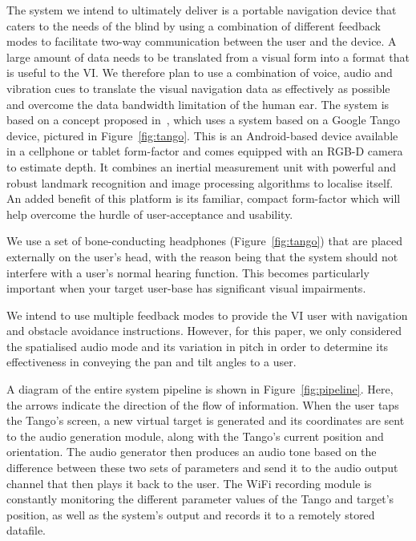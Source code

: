 \documentclass[format=sigconf, review=true, screen=true, anonymous=true]{acmart}
\begin{document}
The system we intend to ultimately deliver is a portable navigation device that caters to the needs of the blind by using a combination of different feedback modes to facilitate two-way communication between the user and the device. A large amount of data needs to be translated from a visual form into a format that is useful to the VI. We therefore plan to use a combination of voice, audio and vibration cues to translate the visual navigation data as effectively as possible and overcome the data bandwidth limitation of the human ear. The system is based on a concept proposed in~\cite{bellotto2013, lock2017portable}, which uses a system based on a Google Tango device, pictured in Figure~\ref{fig:tango}. This is an Android-based device available in a cellphone or tablet form-factor and comes equipped with an RGB-D camera to estimate depth. It combines an inertial measurement unit with powerful and robust landmark recognition and image processing algorithms to localise itself. An added benefit of this platform is its familiar, compact form-factor which will help overcome the hurdle of user-acceptance and usability. %

We use a set of bone-conducting headphones (Figure~\ref{fig:tango}) that are placed externally on the user's head, with the reason being that the system should not interfere with a user's normal hearing function. This becomes particularly important when your target user-base has significant visual impairments. 

We intend to use multiple feedback modes to provide the VI user with navigation and obstacle avoidance instructions. However, for this paper, we only considered the spatialised audio mode and its variation in pitch in order to determine its effectiveness in conveying the pan and tilt angles to a user.

A diagram of the entire system pipeline is shown in Figure~\ref{fig:pipeline}. Here, the arrows indicate the direction of the flow of information. When the user taps the Tango's screen, a new virtual target is generated and its coordinates are sent to the audio generation module, along with the Tango's current position and orientation. The audio generator then produces an audio tone based on the difference between these two sets of parameters and send it to the audio output channel that then plays it back to the user. The WiFi recording module is constantly monitoring the different parameter values of the Tango and target's position, as well as the system's output and records it to a remotely stored datafile. 
\end{document}
